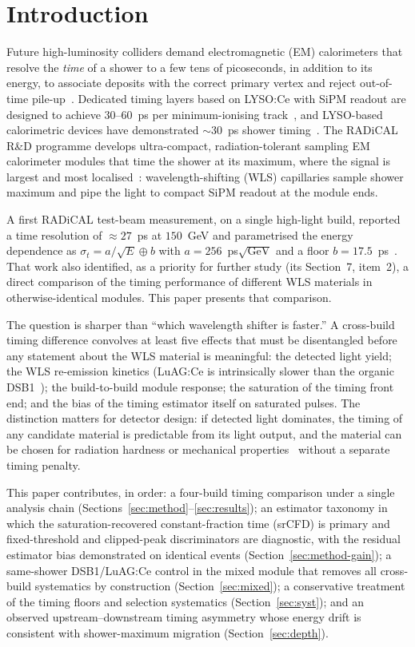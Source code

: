 \documentclass[final,5p,times,twocolumn]{elsarticle}
\begin{document}
\section{Introduction}
\label{sec:intro}

Future high-luminosity colliders demand electromagnetic (EM) calorimeters that resolve
the \emph{time} of a shower to a few tens of picoseconds, in addition to its energy,
to associate deposits with the correct primary vertex and reject out-of-time
pile-up~\cite{cmsmtd,hgtd,hgcal,fcchh,aleksa}. Dedicated timing layers based on
LYSO:Ce with SiPM readout are designed to achieve $30$--$60$~ps per minimum-ionising
track~\cite{cmsmtd}, and LYSO-based calorimetric devices have demonstrated
$\sim\!30$~ps shower timing~\cite{anderson2015}. The RADiCAL R\&D programme develops
ultra-compact, radiation-tolerant sampling EM calorimeter modules that time the shower
at its maximum, where the signal is largest and most
localised~\cite{radical,radhard2022,instruments2022,wetzel2023}: wavelength-shifting
(WLS) capillaries sample shower maximum and pipe the light to compact SiPM readout at
the module ends.

A first RADiCAL test-beam measurement, on a single high-light build, reported a time
resolution of $\approx\!27$~ps at $150$~GeV and parametrised the energy dependence as
$\sigma_t = a/\sqrt{E}\oplus b$ with $a=256$~ps$\sqrt{\mathrm{GeV}}$ and a floor
$b=17.5$~ps~\cite{radical}. That work also identified, as a priority for further study
(its Section~7, item~2), a direct comparison of the timing performance of different WLS
materials in otherwise-identical modules. This paper presents that comparison.

The question is sharper than ``which wavelength shifter is faster.'' A cross-build
timing difference convolves at least five effects that must be disentangled before any
statement about the WLS material is meaningful: the detected light yield; the WLS
re-emission kinetics (LuAG:Ce is intrinsically slower than the organic
DSB1~\cite{luag,lucchini2013}); the build-to-build module response; the saturation of
the timing front end; and the bias of the timing estimator itself on saturated pulses.
The distinction matters for detector design: if detected light dominates, the timing of
any candidate material is predictable from its light output, and the material can be
chosen for radiation hardness or mechanical properties~\cite{luag} without a separate
timing penalty.

This paper contributes, in order: a four-build timing comparison under a single
analysis chain (Sections~\ref{sec:method}--\ref{sec:results}); an estimator taxonomy
in which the saturation-recovered constant-fraction time (srCFD) is primary and
fixed-threshold and clipped-peak discriminators are diagnostic, with the residual
estimator bias demonstrated on identical events (Section~\ref{sec:method-gain}); a
same-shower DSB1/LuAG:Ce control in the mixed module that removes all cross-build
systematics by construction (Section~\ref{sec:mixed}); a conservative treatment of the
timing floors and selection systematics (Section~\ref{sec:syst}); and an observed
upstream--downstream timing asymmetry whose energy drift is consistent with
shower-maximum migration (Section~\ref{sec:depth}).
\end{document}
